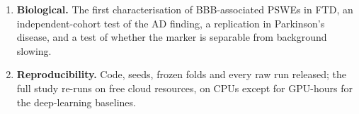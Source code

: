 \begin{enumerate}
        finding \cite{L1,L2,L3}, but a calibration factor for reading published numbers on ds004504 ---
        and an external test of the whole protocol on a Parkinson's disease cohort.
  \item \textbf{Biological.} The first characterisation of BBB-associated PSWEs in FTD, an
        independent-cohort test of the AD finding, a replication in Parkinson's disease, and a test of
        whether the marker is separable from background slowing.
  \item \textbf{Reproducibility.} Code, seeds, frozen folds and every raw run released; the full
        study re-runs on free cloud resources, on CPUs except for \gpuHoursTotal{} GPU-hours for the
        deep-learning baselines.
\end{enumerate}
